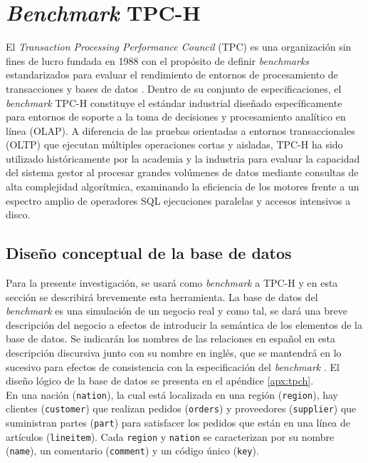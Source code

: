 \documentclass[12pt, letter paper]{report}
\begin{document}
    \section{\textit{Benchmark} TPC-H} %
    \label{sec:benchmark_tpc_h}
      El \textit{Transaction Processing Performance Council} (TPC) es una
      organización sin fines de lucro fundada en 1988 con el propósito de
      definir \textit{benchmarks} estandarizados para evaluar el rendimiento de
      entornos de procesamiento de transacciones y bases de datos
      \cite{transactionprocessingperformancecounciltpctpc2022}. Dentro de su
      conjunto de especificaciones, el \textit{benchmark} TPC-H constituye el
      estándar industrial diseñado específicamente para entornos de soporte a la
      toma de decisiones y procesamiento analítico en línea (OLAP). A diferencia
      de las pruebas orientadas a entornos transaccionales (OLTP) que ejecutan
      múltiples operaciones cortas y aisladas, TPC-H ha sido utilizado
      históricamente por la academia y la industria para evaluar la capacidad
      del sistema gestor al procesar grandes volúmenes de datos mediante 
      consultas de alta complejidad algorítmica, examinando la eficiencia de los
      motores frente a un espectro amplio de operadores SQL ejecuciones
      paralelas y accesos intensivos a disco.

      \subsection{Diseño conceptual de la base de datos} %
      \label{sub:diseño_conceptual_de_la_base_de_datos}
        Para la presente investigación, se usará como \textit{benchmark} a TPC-H
        y en esta sección se describirá brevemente esta herramienta. La base de
        datos del \textit{benchmark} es una simulación de un negocio real y como
        tal, se dará una breve descripción del negocio a efectos de introducir
        la semántica de los elementos de la base de datos. Se indicarán los
        nombres de las relaciones en español en esta descripción discursiva
        junto con su nombre en inglés, que se mantendrá en lo sucesivo para
        efectos de consistencia con la especificación del \textit{benchmark}
        \cite{transactionprocessingperformancecounciltpctpc2022}. El diseño
        lógico de la base de datos se presenta en el apéndice \ref{apx:tpch}.\\

        En una nación (\texttt{nation}), la cual está localizada en una región
        (\texttt{region}), hay clientes (\texttt{customer}) que realizan
        pedidos (\texttt{orders}) y proveedores (\texttt{supplier}) que
        suministran partes (\texttt{part}) para satisfacer los pedidos que
        están en una línea de artículos (\texttt{lineitem}). Cada
        \texttt{region} y \texttt{nation} se caracterizan por su nombre
        (\texttt{name}), un comentario (\texttt{comment}) y un código único
        (\texttt{key}).
\end{document}
